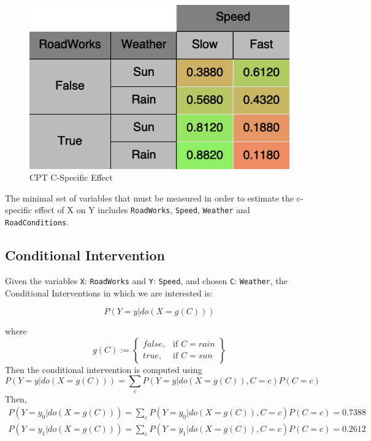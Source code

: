 \documentclass[a4paper,12pt]{article} %
\begin{document}
\begin{figure}[H]
	\centering
	\includegraphics[width=.5\linewidth]{../code/c-specific-effect.png}	
	\caption*{CPT C-Specific Effect}
	\label{fig:c-specific-effect}
\end{figure}
The minimal set of variables that must be measured in order to estimate the c-specific effect of X on Y includes \texttt{RoadWorks}, \texttt{Speed}, \texttt{Weather} and \texttt{RoadConditions}.

\subsection*{Conditional Intervention}
Given the variables \texttt{X}: \texttt{RoadWorks} and \texttt{Y}: \texttt{Speed}, and chosen \texttt{C}: \texttt{Weather}, the Conditional Interventions in which we are interested is: 

$$P(Y=y|do(X=g(C)))$$

where $$ g(C) := \left\{\begin{array}{lr}
false, & \text{if } C=rain\\
true, & \text{if } C=sun
\end{array}\right\}$$
Then the conditional intervention is computed using 
\begin{equation}
	P(Y=y|do(X=g(C))) = \sum_c P(Y=y|do(X=g(C)), C=c)P(C=c)
\end{equation}
Then, 
\begin{equation*}
\begin{aligned}
P(Y=y_0|do(X=g(C))) = \sum_c P(Y=y_0|do(X=g(C)), C=c)P(C=c) = 0.7388\\
P(Y=y_1|do(X=g(C))) = \sum_c P(Y=y_1|do(X=g(C)), C=c)P(C=c) = 0.2612
\end{aligned}
\end{equation*}
\end{document}
